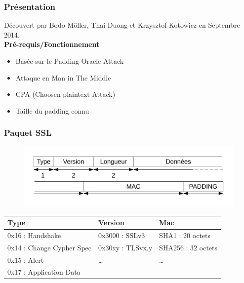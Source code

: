 \begin{frame}
  \frametitle{Présentation}
  Découvert par Bodo Möller, Thai Duong et Krzysztof Kotowicz en Septembre 2014.\\
  \pause
\textbf{Pré-requis/Fonctionnement}
  \begin{itemize}
  \item Basée sur le Padding Oracle Attack
  \item Attaque en Man in The Middle
  \item CPA (Choosen plaintext Attack)
  \item Taille du padding connu
  \end{itemize}

\end{frame}

\begin{frame}
  \frametitle{Paquet SSL}
  \begin{figure}[h]
    \centering
    \includegraphics[scale=0.5]{schemaSSL2}
  \end{figure}
  \begin{tabular}{|l|l|l|}
    \hline
  Type  & Version & Mac \\
    \hline
   0x16 : Handshake  &  0x3000 : SSLv3 &  SHA1 : 20 octets\\
   0x14 : Change Cypher Spec &  0x30xy : TLSvx.y & SHA256 : 32 octets\\
   0x15 : Alert & \dots & \dots\\
   0x17 : Application Data  & &\\
    \hline
  \end{tabular}

\end{frame}

